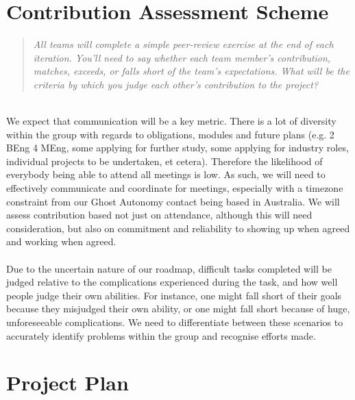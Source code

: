 \documentclass{report}
\newcommand{\teamq}[1]{\begin{quote}
    \large\textit{#1}
\end{quote}}
\begin{document}
\section*{Contribution Assessment Scheme}
\teamq{All teams will complete a simple peer-review exercise at the end of each iteration. You’ll need to say whether each team member’s contribution, matches, exceeds, or falls short of the team’s expectations. What will be the criteria by which you judge each other’s contribution to the project?}
\\
We expect that communication will be a key metric. There is a lot of diversity within the group with regards to obligations, modules and future plans (e.g. 2 BEng 4 MEng, some applying for further study, some applying for industry roles, individual projects to be undertaken, et cetera). Therefore the likelihood of everybody being able to attend all meetings is low. As such, we will need to effectively communicate and coordinate for meetings, especially with a timezone constraint from our Ghost Autonomy contact being based in Australia. We will assess contribution based not just on attendance, although this will need consideration, but also on commitment and reliability to showing up when agreed and working when agreed.
\\
\\Due to the uncertain nature of our roadmap, difficult tasks completed will be judged relative to the complications experienced during the task, and how well people judge their own abilities. For instance, one might fall short of their goals because they misjudged their own ability, or one might fall short because of huge, unforeseeable complications. We need to differentiate between these scenarios to accurately identify problems within the group and recognise efforts made.
\label{sec:projplan}
\section*{Project Plan}

\end{document}
